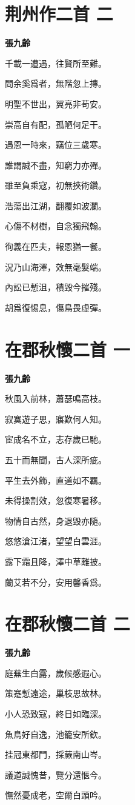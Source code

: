 \documentclass[12pt,a4paper]{ctexbook}
\begin{document}
\section{荆州作二首 二}
\textbf{張九齡}\par\vspace{0.5em}
千載一遭遇，往賢所至難。\par
問余奚爲者，無階忽上摶。\par
明聖不世出，翼亮非苟安。\par
崇高自有配，孤陋何足干。\par
遇恩一時來，竊位三歲寒。\par
誰謂誠不盡，知窮力亦殫。\par
雖至負乘寇，初無挾術鑽。\par
浩蕩出江湖，翻覆如波瀾。\par
心傷不材樹，自念獨飛翰。\par
徇義在匹夫，報恩猶一餐。\par
況乃山海澤，效無毫髮端。\par
內訟已慙沮，積毀今摧殘。\par
胡爲復惕息，傷鳥畏虛彈。\par

\section{在郡秋懷二首 一}
\textbf{張九齡}\par\vspace{0.5em}
秋風入前林，蕭瑟鳴高枝。\par
寂寞遊子思，寤歎何人知。\par
宦成名不立，志存歲已馳。\par
五十而無聞，古人深所疵。\par
平生去外飾，直道如不羈。\par
未得操割效，忽復寒暑移。\par
物情自古然，身退毀亦隨。\par
悠悠滄江渚，望望白雲涯。\par
露下霜且降，澤中草離披。\par
蘭艾若不分，安用馨香爲。\par

\section{在郡秋懷二首 二}
\textbf{張九齡}\par\vspace{0.5em}
庭蕪生白露，歲候感遐心。\par
策蹇慙遠途，巢枝思故林。\par
小人恐致寇，終日如臨深。\par
魚鳥好自逸，池籠安所欽。\par
挂冠東都門，採蕨南山岑。\par
議道誠愧昔，覽分還愜今。\par
憮然憂成老，空爾白頭吟。\par
\end{document}
